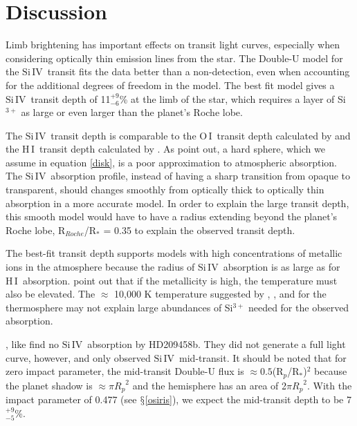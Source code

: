 \documentclass[twocolumn]{emulateapj}
\newcommand{\oi}{\ensuremath{\mathrm{O}\,\scriptstyle \mathrm{I}}}
\newcommand{\hi}{\ensuremath{\mathrm{H}\,\scriptstyle \mathrm{I}}}
\newcommand{\siIV}{\ensuremath{\mathrm{Si}\,\scriptstyle \mathrm{IV}}}
\newcommand{\p}{R$_p$/R$_*$}
\newcommand{\lya}{Lyman-$\alpha$}
\begin{document}
\section{Discussion} \label{discuss}

Limb brightening has important effects on transit light curves, especially when considering optically thin emission lines from the star. The Double-U model for the \siIV\ transit fits the data better than a non-detection, even when accounting for the additional degrees of freedom in the model. The best fit model gives a \siIV\ transit depth of 11$^{+9}_{-6}$\% at the limb  of the star, which requires a layer of Si$^{3+}$ as large or even larger than the planet's Roche lobe.

The \siIV\ transit depth is comparable to the \oi\ transit depth calculated by \citet{vidmad} and the \hi\ transit depth calculated by \citet{benjaf7}. As \citet{kosk} point out, a hard sphere, which we assume in equation \ref{disk}, is a poor approximation to atmospheric absorption. The \siIV\ absorption profile, instead of having a sharp transition from opaque to transparent, should changes smoothly from optically thick to optically thin absorption in a more accurate model. In order to explain the large transit depth, this smooth model would have to have a radius extending beyond the planet's Roche lobe, R$_{Roche}$/R$_*$ = 0.35 \citep{ben10} to explain the observed transit depth.

The best-fit transit depth supports models with high concentrations of metallic ions in the atmosphere because the radius of \siIV\ absorption is as large as for \hi\ absorption. \citet{kosk} point out that if the metallicity is high, the temperature must also be elevated. The $\approx$ 10,000 K temperature suggested by \citet{gmunoz}, \citet{mclay}, and \citet{kosk} for the thermosphere may not explain large abundances of Si$^{3+}$ needed for the observed absorption. 


\citet{linsky}, like \citet{vidmad} find no \siIV\ absorption by HD209458b. They did not generate a full light curve, however, and only observed \siIV\ mid-transit. It should be noted that for zero impact parameter, the mid-transit Double-U flux is $\approx 0.5 $(\p)$^2$ because the planet shadow is $\approx \pi {R_p}^2$ and the hemisphere has an area of 2$\pi {R_p}^2$. With the impact parameter of 0.477 (see $\mathsection$\ref{osiris}), we expect the mid-transit depth to be  7$^{+9}_{-5}$\%. 
\end{document}

